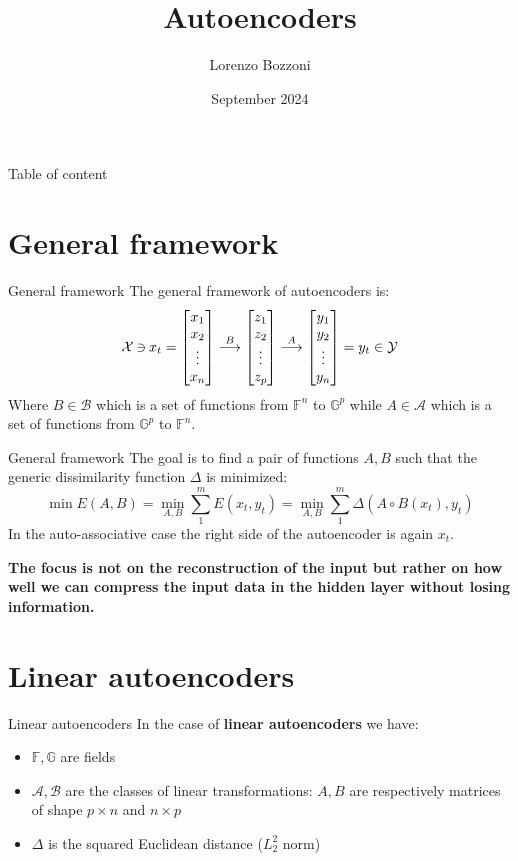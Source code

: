 \documentclass{beamer}
\title{Autoencoders}
\author{Lorenzo Bozzoni}
\institute{Politecnico di Milano}
\date{September 2024}
\newcommand{\revin}{\mathbin{\rotatebox[origin=c]{180}{$\in$}}}
\begin{document}
\frame{\titlepage}



\begin{frame}{Table of content}
    \tableofcontents
\end{frame}


\section{General framework}
\begin{frame}{General framework}
The general framework of autoencoders is:
\[
\mathcal{X} \revin x_t = 
\begin{bmatrix}
    x_1\\
    x_2\\
    \vdots\\
    x_n
\end{bmatrix}
\overset{B}{\longrightarrow}
\begin{bmatrix}
    z_1\\
    z_2\\
    \vdots\\
    z_p
\end{bmatrix}
\overset{A}{\longrightarrow}
\begin{bmatrix}
    y_1\\
    y_2\\
    \vdots\\
    y_n
\end{bmatrix}
= y_t \in \mathcal{Y}
\]
Where $B \in \mathcal{B}$ which is a set of functions from $\mathbb{F}^n$ to $\mathbb{G}^p$ while $A \in \mathcal{A}$ which is a set of functions from $\mathbb{G}^p$ to $\mathbb{F}^n$.
\end{frame}

\begin{frame}{General framework}
The goal is to find a pair of functions $A,B$ such that the generic dissimilarity function $\Delta$ is minimized:
\[
\min E(A,B) = \min_{A,B} \sum_1^m E(x_t,y_t) = \min_{A,B} \sum_1^m \Delta(A \circ B(x_t),y_t)  
\]
In the auto-associative case the right side of the autoencoder is again $x_t$.

\textbf{The focus is not on the reconstruction of the input but rather on how well we can compress the input data in the hidden layer without losing information.}
\end{frame}


\section{Linear autoencoders}
\begin{frame}{Linear autoencoders}
In the case of \textbf{linear autoencoders} we have:
\begin{itemize}
    \item $\mathbb{F},\mathbb{G}$ are fields
    \item $\mathcal{A},\mathcal{B}$ are the classes of linear transformations: $A,B$ are respectively matrices of shape $p \times n$ and $n \times p$
    \item $\Delta$ is the squared Euclidean distance ($L_2^2$ norm)
\end{itemize}
\end{frame}
\end{document}
